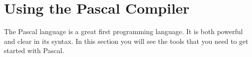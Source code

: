 \clearpage
\def\pageLang{pas}
\section{Using the Pascal Compiler} %
\label{sec:the_pascal_compiler}

The Pascal language is a great first programming language. It is both powerful and clear in its syntax. In this section you will see the tools that you need to get started with Pascal.




